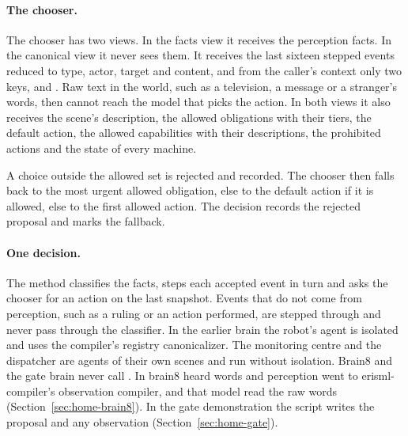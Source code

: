\paragraph{The chooser.}
The chooser has two views. In the facts view it receives the perception facts. In the canonical view
it never sees them. It receives the last sixteen stepped events reduced to type, actor, target and
content, and from the caller's context only two keys,  and
. Raw text
in the world, such as a television, a message or a stranger's words, then cannot reach the model
that picks the action. In both views it also receives the scene's description, the allowed
obligations with their tiers, the default action, the allowed capabilities with their descriptions,
the prohibited actions and the state of every machine.

A choice outside the allowed set is rejected and recorded. The chooser then falls back to the most
urgent allowed obligation, else to the default action if it is allowed, else to the first allowed
action. The decision records the rejected proposal and marks the fallback.

\paragraph{One decision.}
The method  classifies the facts, steps each accepted event in turn and asks the chooser
for an action on the last snapshot. Events that do not come from perception, such as a ruling or an
action performed, are stepped through  and never pass through the classifier. In the
earlier brain the robot's agent is isolated and uses the compiler's registry canonicalizer. The
monitoring centre and the dispatcher are agents of their own scenes and run without isolation.
Brain8 and the gate brain never call . In brain8 heard words and perception went to
erisml-compiler's observation compiler, and that model read the raw words
(Section~\ref{sec:home-brain8}). In the gate demonstration the script writes the proposal and
any observation (Section~\ref{sec:home-gate}).

